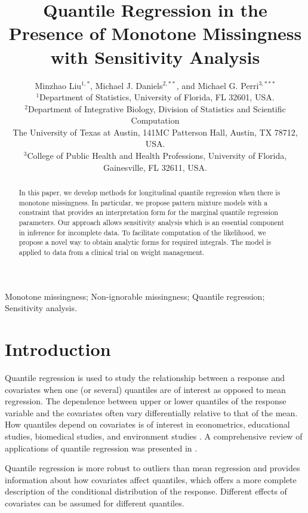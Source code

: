 \documentclass[useAMS,usenatbib,referee]{biom}
\title[Quantile Regression with Missingness]{Quantile Regression in the Presence of Monotone Missingness with Sensitivity Analysis}
\author{Minzhao Liu$^{1,*}$\email{liuminzhao@ufl.edu},
  Michael J. Daniels$^{2,**}$\email{mjdaniels@austin.utexas.edu}, and
Michael G. Perri$^{3,***}$\email{mperri@phhp.ufl.edu} \\
  $^1$Department of Statistics, University of Florida, FL 32601, USA.\\
  $^2$Department of Integrative Biology, Division of Statistics and Scientific
  Computation\\
The University of Texas at Austin, 141MC Patterson Hall,
  Austin, TX 78712, USA.\\
$^3$College of Public Health and Health Professions,
 University of Florida, Gainesville, FL 32611, USA.
}
\begin{document}
\date{}

\pagerange{\pageref{firstpage}--\pageref{lastpage}}


\label{firstpage}

\begin{abstract}
  In this paper, we develop methods for longitudinal quantile regression when there is monotone missingness.
  In particular, we propose pattern mixture models with a constraint that provides an interpretation form for the marginal quantile regression parameters.
  Our approach allows sensitivity analysis which is an essential component in inference for incomplete data.
  To facilitate computation of the likelihood, we propose a novel way to obtain analytic forms for required integrals.
  The model is applied to data from a clinical trial on weight management.
\end{abstract}

\begin{keywords}
  Monotone missingness; Non-ignorable missingness; Quantile regression;
  Sensitivity analysis.
\end{keywords}

\maketitle

\section{Introduction}

Quantile regression is used to study the relationship between a
response and covariates when one (or several) quantiles are of
interest as opposed to mean regression.  The dependence between upper
or lower quantiles of the response variable and the covariates often
vary differentially relative to that of the mean. How quantiles depend
on covariates is of interest in econometrics, educational studies,
biomedical studies, and environment studies \citep{yu2001,
  buchinsky1994,buchinsky1998,he1998, koenker1999,wei2006,yu2003}. A
comprehensive review of applications of quantile regression was
presented in \citet{koenker2005}.

Quantile regression is more robust to outliers than mean regression
and provides information about how covariates affect quantiles, which
offers a more complete description of the conditional distribution of
the response. Different effects of covariates can be assumed for
different quantiles.
\end{document}
